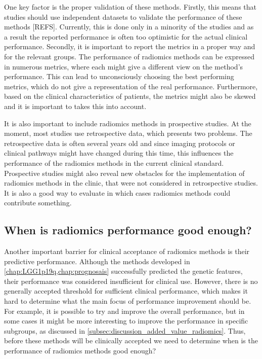 One key factor is the proper validation of these methods.
Firstly, this means that studies should use independent datasets to validate the performance of these methods [REFS].
Currently, this is done only in a minority of the studies and as a result the reported performance is often too optimistic for the actual clinical performance.
Secondly, it is important to report the metrics in a proper way and for the relevant groups.
The performance of radiomics methods can be expressed in numerous metrics, where each might give a different view on the method's performance.
This can lead to unconsciously choosing the best performing metrics, which do not give a representation of the real performance.
Furthermore, based on the clinical characteristics of patients, the metrics might also be skewed and it is important to takes this into account.

It is also important to include radiomics methods in prospective studies.
At the moment, most studies use retrospective data, which presents two problems.
The retrospective data is often several years old and since imaging protocols or clinical pathways might have changed during this time, this influences the performance of the radiomics methods in the current clinical standard.
Prospective studies might also reveal new obstacles for the implementation of radiomics methods in the clinic, that were not considered in retrospective studies.
It is also a good way to evaluate in which cases radiomics methods could contribute something.

\subsection{When is radiomics performance good enough?}\label{subsec:discussion_radiomics_performance}

Another important barrier for clinical acceptance of radiomics methods is their predictive performance.
Although the methods developed in \cref{chap:LGG1p19q,chap:prognosais} successfully predicted the genetic features, their performance was considered insufficient for clinical use.
However, there is no generally accepted threshold for sufficient clinical performance, which makes it hard to determine what the main focus of performance improvement should be.
For example, it is possible to try and improve the overall performance, but in some cases it might be more interesting to improve the performance in specific subgroups, as discussed in \cref{subsec:discussion_added_value_radiomics}.
Thus, before these methods will be clinically accepted we need to determine when is the performance of radiomics methods good enough?


